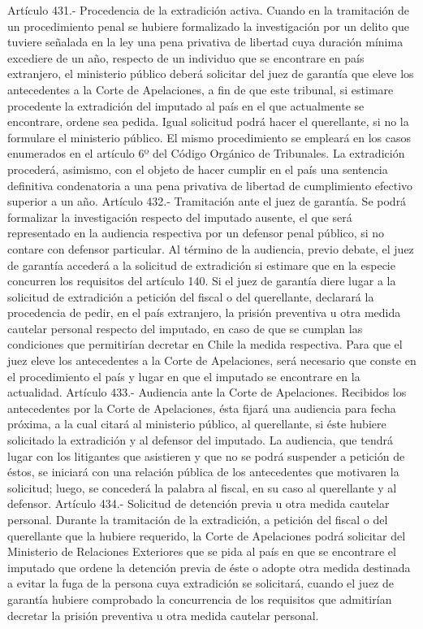     Artículo 431.- Procedencia de la extradición activa. Cuando en la tramitación de un procedimiento penal se hubiere formalizado la investigación por un delito que tuviere señalada en la ley una pena privativa de libertad cuya duración mínima excediere de un año, respecto de un individuo que se encontrare en país extranjero, el ministerio público deberá solicitar del juez de garantía que eleve los antecedentes a la Corte de Apelaciones, a fin de que este tribunal, si estimare procedente la extradición del imputado al país en el que actualmente se encontrare, ordene sea pedida. Igual solicitud podrá hacer el querellante, si no la formulare el ministerio público.
    El mismo procedimiento se empleará en los casos enumerados en el artículo 6º del Código Orgánico de Tribunales.
    La extradición procederá, asimismo, con el objeto de hacer cumplir en el país una sentencia definitiva condenatoria a una pena privativa de libertad de cumplimiento efectivo superior a un año.
    Artículo 432.- Tramitación ante el juez de garantía. Se podrá formalizar la investigación respecto del imputado ausente, el que será representado en la audiencia respectiva por un defensor penal público, si no contare con defensor particular.
    Al término de la audiencia, previo debate, el juez de garantía accederá a la solicitud de extradición si estimare que en la especie concurren los requisitos del artículo 140.
    Si el juez de garantía diere lugar a la solicitud de extradición a petición del fiscal o del querellante, declarará la procedencia de pedir, en el país extranjero, la prisión preventiva u otra medida cautelar personal respecto del imputado, en caso de que se cumplan las condiciones que permitirían decretar en Chile la medida respectiva.
    Para que el juez eleve los antecedentes a la Corte de Apelaciones, será necesario que conste en el procedimiento el país y lugar en que el imputado se encontrare en la actualidad.
    Artículo 433.- Audiencia ante la Corte de Apelaciones. Recibidos los antecedentes por la Corte de Apelaciones, ésta fijará una audiencia para fecha próxima, a la cual citará al ministerio público, al querellante, si éste hubiere solicitado la extradición y al defensor del imputado. La audiencia, que tendrá lugar con los litigantes que asistieren y que no se podrá suspender a petición de éstos, se iniciará con una relación pública de los antecedentes que motivaren la solicitud; luego, se concederá la palabra al fiscal, en su caso al querellante y al defensor.
    Artículo 434.- Solicitud de detención previa u otra medida cautelar personal. Durante la tramitación de la extradición, a petición del fiscal o del querellante que la hubiere requerido, la Corte de Apelaciones podrá solicitar del Ministerio de Relaciones Exteriores que se pida al país en que se encontrare el imputado que ordene la detención previa de éste o adopte otra medida destinada a evitar la fuga de la persona cuya extradición se solicitará, cuando el juez de garantía hubiere comprobado la concurrencia de los requisitos que admitirían decretar la prisión preventiva u otra medida cautelar personal.
